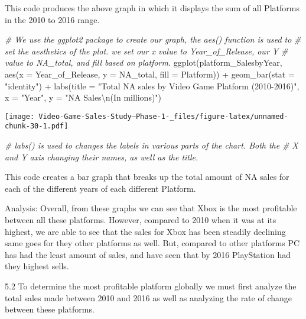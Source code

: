\documentclass[
]{article}
\newenvironment{Shaded}{\begin{snugshade}}{\end{snugshade}}
\newcommand{\AttributeTok}[1]{\textcolor[rgb]{0.77,0.63,0.00}{#1}}
\newcommand{\CommentTok}[1]{\textcolor[rgb]{0.56,0.35,0.01}{\textit{#1}}}
\newcommand{\FunctionTok}[1]{\textcolor[rgb]{0.00,0.00,0.00}{#1}}
\newcommand{\NormalTok}[1]{#1}
\newcommand{\SpecialCharTok}[1]{\textcolor[rgb]{0.00,0.00,0.00}{#1}}
\newcommand{\StringTok}[1]{\textcolor[rgb]{0.31,0.60,0.02}{#1}}
\begin{document}
This code produces the above graph in which it displays the sum of all
Platforms in the 2010 to 2016 range.

\begin{Shaded}
\begin{Highlighting}[]
\CommentTok{\# We use the ggplot2 package to create our graph, the aes() function is used to}
\CommentTok{\# set the aesthetics of the plot. we set our x value to Year\_of\_Release, our Y}
\CommentTok{\# value to NA\_total, and fill based on platform.}
\FunctionTok{ggplot}\NormalTok{(platform\_SalesbyYear, }\FunctionTok{aes}\NormalTok{(}\AttributeTok{x =}\NormalTok{ Year\_of\_Release, }\AttributeTok{y =}\NormalTok{ NA\_total, }\AttributeTok{fill =}\NormalTok{ Platform)) }\SpecialCharTok{+}
    \FunctionTok{geom\_bar}\NormalTok{(}\AttributeTok{stat =} \StringTok{"identity"}\NormalTok{) }\SpecialCharTok{+} \FunctionTok{labs}\NormalTok{(}\AttributeTok{title =} \StringTok{"Total NA sales by Video Game Platform (2010{-}2016)"}\NormalTok{,}
    \AttributeTok{x =} \StringTok{"Year"}\NormalTok{, }\AttributeTok{y =} \StringTok{"NA Sales}\SpecialCharTok{\textbackslash{}n}\StringTok{(In millions)"}\NormalTok{)}
\end{Highlighting}
\end{Shaded}

\texttt{[image: Video-Game-Sales-Study--Phase-1-\_files/figure-latex/unnamed-chunk-30-1.pdf]}

\begin{Shaded}
\begin{Highlighting}[]
\CommentTok{\# labs() is used to changes the labels in various parts of the chart. Both the}
\CommentTok{\# X and Y axis changing their names, as well as the title.}
\end{Highlighting}
\end{Shaded}

This code creates a bar graph that breaks up the total amount of NA
sales for each of the different years of each different Platform.

Analysis: Overall, from these graphs we can see that Xbox is the most
profitable between all these platforms. However, compared to 2010 when
it was at its highest, we are able to see that the sales for Xbox has
been steadily declining same goes for they other platforms as well. But,
compared to other platforms PC has had the least amount of sales, and
have seen that by 2016 PlayStation had they highest sells.

5.2 To determine the most profitable platform globally we must first
analyze the total sales made between 2010 and 2016 as well as analyzing
the rate of change between these platforms.
\end{document}
